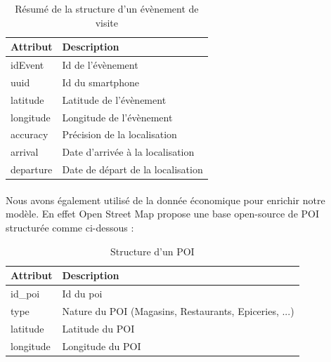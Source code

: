 \begin{table}[H]
    \centering
    \begin{tabular}{|l|l|}
    \hline
    \textbf{Attribut} & \textbf{Description}              \\ \hline
    idEvent           & Id de l'évènement                 \\ \hline
    uuid              & Id du smartphone                  \\ \hline
    latitude          & Latitude de l'évènement           \\ \hline
    longitude         & Longitude de l'évènement          \\ \hline
    accuracy          & Précision de la localisation      \\ \hline
    arrival           & Date d'arrivée à la localisation  \\ \hline
    departure         & Date de départ de la localisation \\ \hline
    \end{tabular}
    \caption{Résumé de la structure d'un évènement de visite}
\end{table}

\paragraph*{}

Nous avons également utilisé de la donnée économique pour enrichir notre modèle. En effet Open Street Map propose une base open-source de POI structurée comme ci-dessous :

\begin{table}[H]
    \centering
    \begin{tabular}{|l|l|}
    \hline
    \textbf{Attribut} & \textbf{Description}                                  \\ \hline
    id\_poi           & Id du poi                                             \\ \hline
    type              & Nature du POI (Magasins, Restaurants, Epiceries, ...) \\ \hline
    latitude          & Latitude du POI                                       \\ \hline
    longitude         & Longitude du POI                                      \\ \hline
    \end{tabular}
    \caption{Structure d'un POI}
\end{table}

